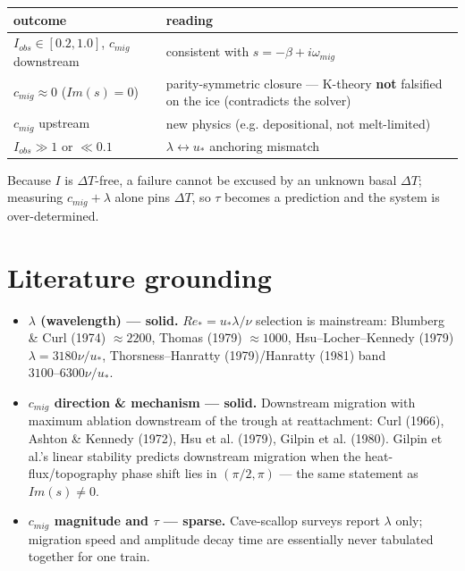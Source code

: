 \documentclass[tc, manuscript]{copernicus}
\begin{document}
\begin{center}\small
\begin{tabularx}{\linewidth}{>{\raggedright\arraybackslash}X>{\raggedright\arraybackslash}X}
\hline
outcome & reading \\
\hline
$I_{obs} \in  [0.2,1.0]$, $c_{mig}$ downstream & consistent with $s=-\beta +i\omega _{mig}$ \\
$c_{mig} \approx  0$ ($Im(s)=0$) & parity-symmetric closure — K-theory \textbf{not} falsified on the ice (contradicts the solver) \\
$c_{mig}$ upstream & new physics (e.g. depositional, not melt-limited) \\
$I_{obs} \gg  1$ or $\ll  0.1$ & $\lambda  \leftrightarrow  u_*$ anchoring mismatch \\
\hline
\end{tabularx}
\end{center}

Because $I$ is $\Delta T$-free, a failure cannot be excused by an unknown basal $\Delta T$; measuring $c_{mig} + \lambda $ alone pins $\Delta T$, so $\tau $ becomes a prediction and the system is over-determined.

\section{Literature grounding}

\begin{itemize}
\item \textbf{$\lambda $ (wavelength) — solid.} $Re_*=u_*\lambda /\nu $ selection is mainstream: Blumberg \& Curl (1974) $\approx 2200$, Thomas (1979) $\approx 1000$, Hsu–Locher–Kennedy (1979) $\lambda =3180 \nu /u_*$, Thorsness–Hanratty (1979)/Hanratty (1981) band $3100\mbox{--}6300 \nu /u_*$.
\item \textbf{$c_{mig}$ direction \& mechanism — solid.} Downstream migration with maximum ablation downstream of the trough at reattachment: Curl (1966), Ashton \& Kennedy (1972), Hsu et al. (1979), Gilpin et al. (1980). Gilpin et al.'s linear stability predicts downstream migration when the heat-flux/topography phase shift lies in $(\pi /2, \pi )$ — the same statement as $Im(s)\ne 0$.
\item \textbf{$c_{mig}$ magnitude and $\tau $ — sparse.} Cave-scallop surveys report $\lambda $ only; migration speed and amplitude decay time are essentially never tabulated together for one train.
\end{itemize}
\end{document}
